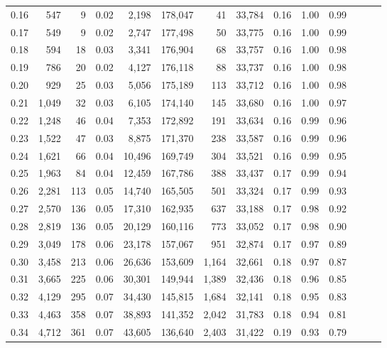 \begin{tabular}{rrrrrrrrrrrrrr}
0.16 &    547 &      9 &  0.02 &    2,198 &  178,047 &      41 &  33,784 &  0.16 &  1.00 &      0.99 \\
0.17 &    549 &      9 &  0.02 &    2,747 &  177,498 &      50 &  33,775 &  0.16 &  1.00 &      0.99 \\
0.18 &    594 &     18 &  0.03 &    3,341 &  176,904 &      68 &  33,757 &  0.16 &  1.00 &      0.98 \\
0.19 &    786 &     20 &  0.02 &    4,127 &  176,118 &      88 &  33,737 &  0.16 &  1.00 &      0.98 \\
0.20 &    929 &     25 &  0.03 &    5,056 &  175,189 &     113 &  33,712 &  0.16 &  1.00 &      0.98 \\
0.21 &  1,049 &     32 &  0.03 &    6,105 &  174,140 &     145 &  33,680 &  0.16 &  1.00 &      0.97 \\
0.22 &  1,248 &     46 &  0.04 &    7,353 &  172,892 &     191 &  33,634 &  0.16 &  0.99 &      0.96 \\
0.23 &  1,522 &     47 &  0.03 &    8,875 &  171,370 &     238 &  33,587 &  0.16 &  0.99 &      0.96 \\
0.24 &  1,621 &     66 &  0.04 &   10,496 &  169,749 &     304 &  33,521 &  0.16 &  0.99 &      0.95 \\
0.25 &  1,963 &     84 &  0.04 &   12,459 &  167,786 &     388 &  33,437 &  0.17 &  0.99 &      0.94 \\
0.26 &  2,281 &    113 &  0.05 &   14,740 &  165,505 &     501 &  33,324 &  0.17 &  0.99 &      0.93 \\
0.27 &  2,570 &    136 &  0.05 &   17,310 &  162,935 &     637 &  33,188 &  0.17 &  0.98 &      0.92 \\
0.28 &  2,819 &    136 &  0.05 &   20,129 &  160,116 &     773 &  33,052 &  0.17 &  0.98 &      0.90 \\
0.29 &  3,049 &    178 &  0.06 &   23,178 &  157,067 &     951 &  32,874 &  0.17 &  0.97 &      0.89 \\
0.30 &  3,458 &    213 &  0.06 &   26,636 &  153,609 &   1,164 &  32,661 &  0.18 &  0.97 &      0.87 \\
0.31 &  3,665 &    225 &  0.06 &   30,301 &  149,944 &   1,389 &  32,436 &  0.18 &  0.96 &      0.85 \\
0.32 &  4,129 &    295 &  0.07 &   34,430 &  145,815 &   1,684 &  32,141 &  0.18 &  0.95 &      0.83 \\
0.33 &  4,463 &    358 &  0.07 &   38,893 &  141,352 &   2,042 &  31,783 &  0.18 &  0.94 &      0.81 \\
0.34 &  4,712 &    361 &  0.07 &   43,605 &  136,640 &   2,403 &  31,422 &  0.19 &  0.93 &      0.79 \\

\end{tabular}
